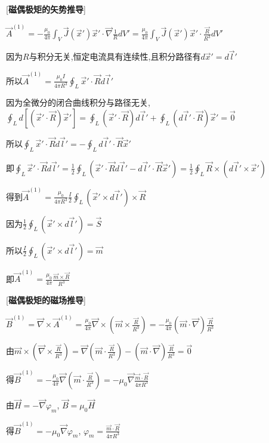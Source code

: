 [\textbf{磁偶极矩的矢势推导}]\par
\qquad $\vec A^{(1)}=-\frac{\mu_0}{4\pi}\int_V\vec J(\vec x')\vec x'\cdot\vec\nabla\frac{1}{R}dV'=\frac{\mu_0}{4\pi}\int_V\vec J(\vec x')\vec x'\cdot\frac{\vec R}{R^3}dV'$\par
\qquad 因为$R$与积分无关,恒定电流具有连续性,且积分路径有$d\vec x'=d\vec l'$\par
\qquad \quad 所以$\vec A^{(1)}=\frac{\mu_0I}{4\pi R^3}\oint_L\vec x'\cdot\vec R d\vec l'$\par
\qquad 因为全微分的闭合曲线积分与路径无关, $\oint_Ld[(\vec x'\cdot\vec R)\vec x']=\oint_L(\vec x'\cdot\vec R)d\vec l'+\oint_L(d\vec l'\cdot\vec R)\vec x'=\vec 0$\par
\qquad \quad 所以$\oint_L\vec x'\cdot\vec Rd\vec l'=-\oint_Ld\vec l'\cdot\vec R\vec x'$\par
\qquad \quad 即$\oint_L\vec x'\cdot\vec Rd\vec l'=\frac{1}{2}\oint_L\left(\vec x'\cdot\vec Rd\vec l'-d\vec l'\cdot\vec R\vec x'\right)=\frac{1}{2}\oint_L\vec R\times(d\vec l'\times\vec x')$\par
\qquad 得到$\vec A^{(1)}=\frac{\mu_0}{4\pi R^3}\frac{I}{2}\oint_L(\vec x'\times d\vec l')\times\vec R$\par
\qquad 因为$\frac{1}{2}\oint_L(\vec x'\times d\vec l')=\vec S$\par
\qquad \quad 所以$\frac{I}{2}\oint_L(\vec x'\times d\vec l')=\vec m$\par
\qquad \quad 即$\vec A^{(1)}=\frac{\mu_0}{4\pi}\frac{\vec m\times\vec R}{R^3}$\par

[\textbf{磁偶极矩的磁场推导}]\par
\qquad $\vec B^{(1)}=\vec\nabla\times\vec A^{(1)}=\frac{\mu_0}{4\pi}\vec\nabla\times(\vec m\times\frac{\vec R}{R^3})=-\frac{\mu_0}{4\pi}(\vec m\cdot\vec\nabla)\frac{\vec R}{R^3}$\par
\qquad 由$\vec m\times(\vec\nabla\times\frac{\vec R}{R^3})=\vec\nabla(\vec m\cdot\frac{\vec R}{R^3})-(\vec m\cdot\vec\nabla)\frac{\vec R}{R^3}=\vec 0$\par
\qquad \quad 得$\vec B^{(1)}=-\frac{\mu_0}{4\pi}\vec\nabla(\vec m\cdot\frac{\vec R}{R^3})=-\mu_0\vec\nabla\frac{\vec m\cdot\vec R}{4\pi R^3}$\par
\qquad 由$\vec H=-\vec\nabla\varphi_m$, $\vec B=\mu_0\vec H$\par
\qquad \quad 得$\vec B^{(1)}=-\mu_0\vec\nabla\varphi_m$, $\varphi_m=\frac{\vec m\cdot\vec R}{4\pi R^3}$\par

